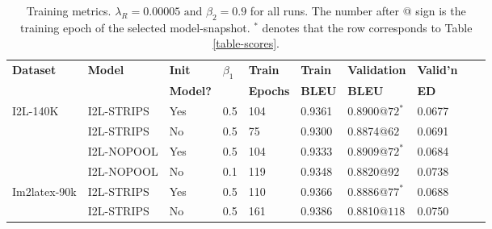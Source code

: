 \documentclass{article}
\begin{document}
\begin{table*}[!hbtp]
	\caption{Training metrics. $\lambda_R=0.00005 \text{~and~} \beta_2 = 0.9$ for all runs. The number after @ sign is the training epoch of the selected model-snapshot. $^*$ denotes that the row corresponds to Table \ref{table-scores}.}
	\begin{tabular}{lll|lll|llll}
		\hline
		\textbf{Dataset} & \textbf{Model} & \textbf{Init}  &\textbf{$\beta_1$}  & \textbf{Train}  & \textbf{Train} & \textbf{Validation}  & \textbf{Valid'n}\\&                & \textbf{Model?}&                    & \textbf{Epochs} & \textbf{BLEU}  & \textbf{BLEU}        & \textbf{ED}        \\\hline 
		I2L-140K    & I2L-STRIPS & Yes & 0.5 & 104 & 0.9361 & 0.8900@$72^*$ & 0.0677 \\& I2L-STRIPS & No  & 0.5 & 75  & 0.9300 & 0.8874@$62$   & 0.0691 \\& I2L-NOPOOL & Yes & 0.5 & 104 & 0.9333 & 0.8909@$72^*$ & 0.0684 \\& I2L-NOPOOL & No  & 0.1 & 119 & 0.9348 & 0.8820@$92$   & 0.0738 \\\hline
		Im2latex-90k& I2L-STRIPS & Yes & 0.5 & 110 & 0.9366 & 0.8886@$77^*$ & 0.0688 \\& I2L-STRIPS & No  & 0.5 & 161 & 0.9386 & 0.8810@$118$  & 0.0750 \\\hline
	\end{tabular}
	\centering
	\label{table-training1}
\end{table*}
\end{document}
